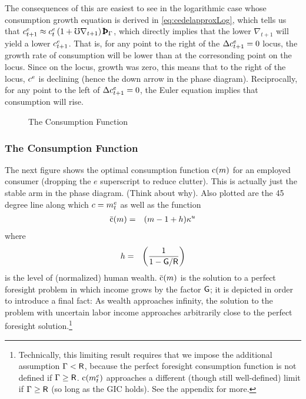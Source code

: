 \documentclass{handout}
\begin{document}
The consequences of this are easiest to see in the logarithmic case whose consumption growth equation is derived in \eqref{eq:cedelapproxLog}, which tells us that $\cRatE_{t+1} \approx \cRatE_{t}\left(1+ \urate \nabla _{t+1}\right) {\PatPGro}$, which directly 
implies that the lower $\nabla_{t+1}$ will yield a lower $c^{e}_{t+1}$.  That is, for any point to the right of the $\Delta c^{e}_{t+1}=0$ locus, the growth rate of consumption will be lower than at the corresonding point on the locus.  Since on the locus, growth
was zero, this means that to the right of the locus, $c^{e}$ is declining (hence the down arrow in the phase diagram).  Reciprocally, for any point to the left of $\Delta c^{e}_{t+1}=0$, the Euler equation implies that consumption will rise.


\begin{figure}
\caption{The Consumption Function}\label{fig:cFunc}
\end{figure}

\subsubsection{The Consumption Function}
The next figure shows the optimal consumption function $\mathrm{c}(m)$ for an
employed consumer (dropping the $e$ superscript to reduce clutter).  This
is actually just the stable arm in the phase diagram.  (Think about
why).  Also plotted are the 45 degree line along which $c = m^{e}_{t}$
as well as the function
\begin{eqnarray}
  \bar{\mathrm{c}}(m) & = & (m-1+h)\kappa^{u}
\end{eqnarray}
where
\begin{eqnarray}
  h & = & \left(\frac{1}{1-\mathsf{G}/\mathsf{R}}\right)
\end{eqnarray}
is the level of (normalized) human wealth.  $\bar{\mathrm{c}}(m)$ is the
solution to a perfect foresight problem in which income 
grows by the factor $\mathsf{G}$; it is depicted in order to
introduce a final fact: As wealth approaches infinity, the solution
to the problem with uncertain labor income approaches arbitrarily
close to the perfect foresight solution.\footnote{Technically, this
  limiting result requires that we impose the additional assumption
  $\Gamma < \mathsf{R}$, because the perfect foresight consumption function is
  not defined if $\Gamma \geq \mathsf{R}$.  $\mathrm{c}(m^{e}_{t})$ approaches a
  different (though still well-defined) limit if $\Gamma \geq \mathsf{R}$ (so
  long as the GIC holds).  See the appendix for more.}
\end{document}
